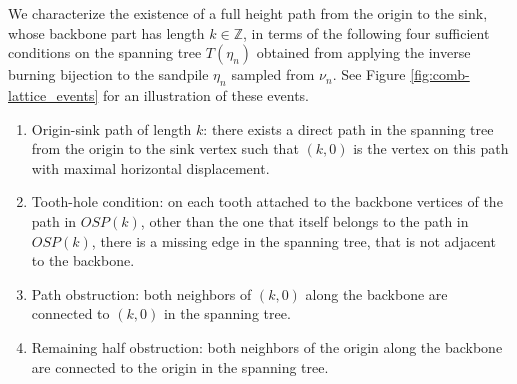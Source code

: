 \documentclass[11pt]{article}
\newcommand{\Z}{\mathbb{Z}}
\begin{document}
We characterize the existence of a full height path from the origin to the sink, whose backbone part has length $k\in\Z$, in terms of the following four sufficient conditions on the spanning tree $T(\eta_n)$ obtained from applying the inverse burning bijection to the sandpile $\eta_n$ sampled from $\nu_n$. See Figure \ref{fig:comb-lattice_events} for an illustration of these events.

\begin{enumerate}[leftmargin=1.8cm, labelwidth=1.57cm]
    \item[$OSP(k)$]\label{osp} Origin-sink path of length $k$: there exists a direct path in the spanning tree from the origin to the sink vertex such that $(k,0)$ is the vertex on this path with maximal horizontal displacement.
    \item[$TH(k)$]\label{thk}   Tooth-hole condition: on each tooth attached to the backbone vertices of the path in $OSP(k)$, other than the one that itself belongs to the path in $OSP(k)$, there is a missing edge in the spanning tree, that is not adjacent to the backbone.
    \item[$PO(k)$]\label{rok} Path obstruction: both neighbors of $(k,0)$ along the backbone are connected to $(k,0)$ in the spanning tree.
    \item[$RHO(k)$]\label{lok} Remaining half obstruction: both neighbors of the origin along the backbone are connected to the origin in the spanning tree.
\end{enumerate}
\end{document}
